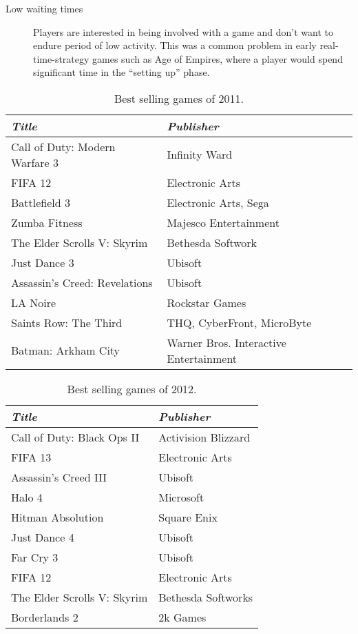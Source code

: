 \begin{description}
\item[Low waiting times]
Players are interested in being involved with a game and don't want to endure period of low activity. This was a common problem in early real-time-strategy games such as Age of Empires, where a player would spend significant time in the ``setting up'' phase.

\end{description}



\begin{table*}[ht]
	\begin{tabular}{p{15em} p{13em}}
		\toprule
		\emph{Title} & \emph{Publisher}\\
		\midrule
	Call of Duty: Modern Warfare 3 & Infinity Ward
	\\
	FIFA 12 & Electronic Arts
	\\
	Battlefield 3 & Electronic Arts, Sega
	\\
	Zumba Fitness & Majesco Entertainment
	\\
	The Elder Scrolls V: Skyrim & Bethesda Softwork
	\\
	Just Dance 3 & Ubisoft
	\\
	Assassin's Creed: Revelations & Ubisoft
	\\
	LA Noire & Rockstar Games
	\\
	Saints Row: The Third & THQ, CyberFront, MicroByte
	\\
	Batman: Arkham City & Warner Bros. Interactive Entertainment 
	\\
	\bottomrule
	\end{tabular}
	\caption{Best selling games of 2011.}
	\label{tab:bestSellingGames2011}
\end{table*}

\begin{table*}[ht]
	\begin{tabular}{p{15em} p{13em}}
		\toprule
		\emph{Title} & \emph{Publisher}\\
		\midrule
	Call of Duty: Black Ops II & Activision Blizzard
	\\
	FIFA 13 & Electronic Arts
	\\
	Assassin's Creed III & Ubisoft
	\\
    Halo 4 & Microsoft	
    \\
	Hitman Absolution & Square Enix
	\\
	Just Dance 4 & Ubisoft
	\\
	Far Cry 3 & Ubisoft
	\\
	FIFA 12 & Electronic Arts
	\\
	The Elder Scrolls V: Skyrim & Bethesda Softworks
	\\
	Borderlands 2 & 2k Games
	\\
	
	\bottomrule
	\end{tabular}
	\caption{Best selling games of 2012.}
	\label{tab:bestSellingGames2012}
\end{table*}

